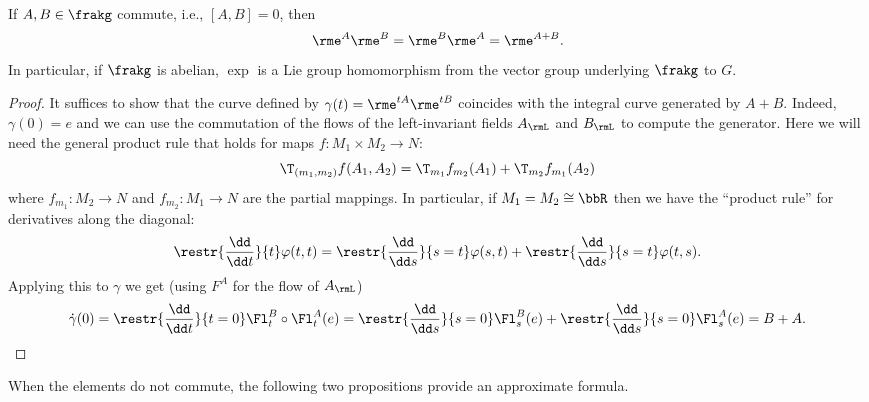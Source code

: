 \begin{prop}\label{prop exp on abelian groups}
    If $A,B\in\frakg$ commute, i.e., $[A,B]=0$, then
    \[\rme^A\rme^B=\rme^B\rme^A=\rme^{A+B}.\]
    In particular, if $\frakg$ is abelian, $\exp$ is a Lie group homomorphism from the vector group underlying $\frakg$ to $G$.
\end{prop}
\begin{proof}
    It suffices to show that the curve defined by $\gamma(t)=\rme^{tA}\rme^{tB}$ coincides with the integral curve generated by $A+B$. Indeed, $\gamma(0)=e$ and we can use the commutation of the flows of the left-invariant fields $A_\rmL$ and $B_\rmL$ to compute the generator. Here we will need the general product rule that holds for maps $f:M_1\times M_2\to N$:
    \[\T_{(m_1,m_2)}f(A_1,A_2)=\T_{m_1}f_{m_2}(A_1)+\T_{m_2}f_{m_1}(A_2)\]
    where $f_{m_1}:M_2\to N$ and $f_{m_2}:M_1\to N$ are the partial mappings. In particular, if $M_1=M_2\cong \bbR$ then we have the ``product rule'' for derivatives along the diagonal:
    \[\restr{\frac{\dd}{\dd t}}{t}\varphi(t,t)=\restr{\frac{\dd}{\dd s}}{s=t}\varphi(s,t)+\restr{\frac{\dd}{\dd s}}{s=t}\varphi(t,s).\]
    Applying this to $\gamma$ we get (using $F^A$ for the flow of $A_\rmL$)
    \begin{multline}
        \dot\gamma(0)=\restr{\frac{\dd}{\dd t}}{t=0} \Fl^{B}_t\circ \Fl^{A}_t (e)=\restr{\frac{\dd}{\dd s}}{s=0}\Fl^{B}_{s}(e)+\restr{\frac{\dd}{\dd s}}{s=0}\Fl^{A}_{s}(e)=B+A.
    \end{multline}
\end{proof}

When the elements do not commute, the following two propositions provide an approximate formula.


